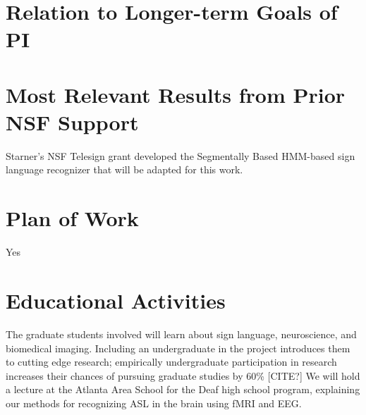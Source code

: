\documentclass{proposal}
\begin{document}
\section{Relation to Longer-term Goals of PI}

\section{Most Relevant Results from Prior NSF Support}

Starner's NSF Telesign grant developed the Segmentally Based HMM-based sign language recognizer that will be adapted for this work.


\section{Plan of Work}

Yes

\section{Educational Activities}

The graduate students involved will learn about sign language, neuroscience, and biomedical imaging. Including an undergraduate in the project introduces them to cutting edge research; empirically undergraduate participation in research increases their chances of pursuing graduate studies by 60\% [CITE?] We will hold a lecture at the Atlanta Area School for the Deaf high school program, explaining our methods for recognizing ASL in the brain using fMRI and EEG.




\end{document}
